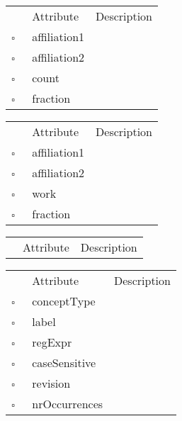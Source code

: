 \begin{table}
\caption{CollabCount  }

\begin{longtable}{llp{8cm}}
& Attribute & Description \\
$\square$\ & affiliation1 &  \\
$\square$\ & affiliation2 &  \\
$\square$\ & count &  \\
$\square$\ & fraction &  \\
\end{longtable}
\label{attr:CollabCount}
\end{table}

\begin{table}
\caption{CollabWork  }

\begin{longtable}{llp{8cm}}
& Attribute & Description \\
$\square$\ & affiliation1 &  \\
$\square$\ & affiliation2 &  \\
$\square$\ & work &  \\
$\square$\ & fraction &  \\
\end{longtable}
\label{attr:CollabWork}
\end{table}

\begin{table}
\caption{Collection  }

\begin{longtable}{llp{8cm}}
& Attribute & Description \\
\end{longtable}
\label{attr:Collection}
\end{table}

\clearpage
\begin{table}
\caption{Concept  }

\begin{longtable}{llp{8cm}}
& Attribute & Description \\
$\square$\ & conceptType &  \\
$\square$\ & label &  \\
$\square$\ & regExpr &  \\
$\square$\ & caseSensitive &  \\
$\square$\ & revision &  \\
$\square$\ & nrOccurrences &  \\
\end{longtable}
\label{attr:Concept}
\end{table}

